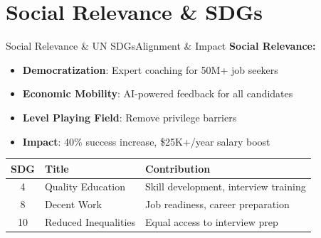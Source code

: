 \documentclass{beamer}
\begin{document}
\section{Social Relevance \& SDGs}
\begin{frame}{Social Relevance \& UN SDGs}{Alignment \& Impact}
\small
\textbf{Social Relevance:}
\begin{itemize}\setlength{\itemsep}{2pt}
    \item \textbf{Democratization}: Expert coaching for 50M+ job seekers
    \item \textbf{Economic Mobility}: AI-powered feedback for all candidates
    \item \textbf{Level Playing Field}: Remove privilege barriers
    \item \textbf{Impact}: 40\% success increase, \$25K+/year salary boost
\end{itemize}

\vspace{2pt}

\begin{table}
\centering
\scriptsize
\begin{tabular}{|c|l|p{5cm}|}
\hline
\textbf{SDG} & \textbf{Title} & \textbf{Contribution} \\ \hline
4 & Quality Education & Skill development, interview training \\ \hline
8 & Decent Work & Job readiness, career preparation \\ \hline
10 & Reduced Inequalities & Equal access to interview prep \\ \hline
\end{tabular}
\end{table}
\end{frame}

\end{document}
